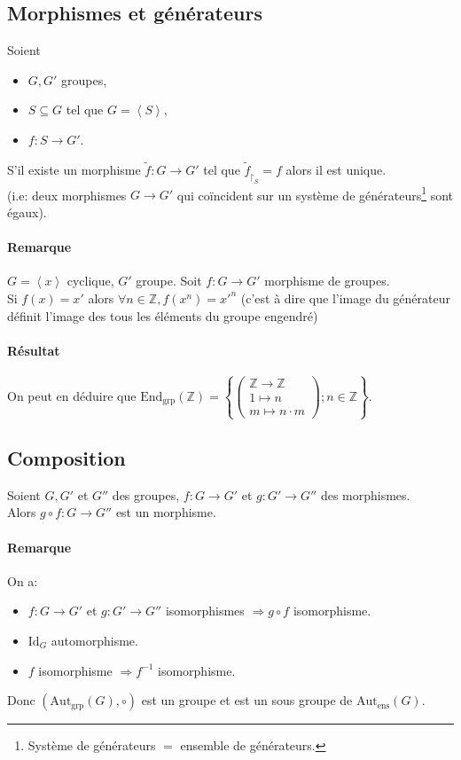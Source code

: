 \documentclass[a4paper,10pt]{report}
\newcommand{\mt}[1]{\widetilde{ #1 }} %
\newcommand{\grp}[1]{\left\langle #1 \right\rangle} %
\newcommand{\set}[1]{\left\lbrace #1 \right\rbrace } %
\newcommand{\IZ}{\mathbb{Z}} %
\newcommand{\so}{\Rightarrow}
\newcommand{\id}{\mathrm{Id}} %
\newcommand{\rstrct}[2]{{ #1 }_{\upharpoonright_{ #2 }}} %
\newcommand{\mfootnote}[1]{\up{(}\footnote{#1}\up{)}}
\newcommand{\Autgrp}[1]{\text{Aut}_{\text{grp}}\left(#1\right)}
\newcommand{\Autens}[1]{\text{Aut}_{\text{ens}}\left(#1\right)}
\begin{document}
   \subsection{Morphismes et générateurs}
    Soient
    \begin{itemize}
      \item $G, G'$ groupes,
      \item $S \subseteq G$ tel que $G=\grp{S}$,
      \item $f: S \to G'$.
    \end{itemize}
    S'il existe un morphisme $\mt{f}:G \to G'$ tel que
    $\rstrct{\mt{f}}{S}=f$ alors il est unique.\\
    (i.e: deux morphismes $G \to G'$ qui coïncident sur un système de
    générateurs\mfootnote{Système de générateurs $=$ ensemble de
    générateurs.} sont égaux).
    \begin{comment}
      \mfootnote{Preuve : 22/10/08 p1}
    \end{comment}

    \paragraph{Remarque}
     $G=\grp{x}$ cyclique, $G'$ groupe. Soit $f:G \to G'$ morphisme de
     groupes.\\
     Si $f(x)=x'$ alors $\forall n \in \IZ, f(x^n)=x'^n$ (c'est à dire que
     l'image du générateur définit l'image des tous les éléments du groupe
     engendré)

    \paragraph{Résultat}
     On peut en déduire que $\text{End}_{\text{grp}}(\IZ) = \set{\left(
     \begin{matrix}
       \IZ \to \IZ\\
       1 \mapsto n\\
       m \mapsto n\cdot m
     \end{matrix} \right); n \in \IZ}$.

   \subsection{Composition}
    Soient $G,G'$ et $G''$ des groupes, $f:G \to G'$ et $g:G' \to G''$ des
    morphismes.\\
    Alors $g\circ f: G \to G''$ est un morphisme.

    \paragraph{Remarque}
     On a: 
     \begin{itemize}
       \item $f:G\to G'$ et $g:G'\to G''$ isomorphismes $\so g\circ f$
         isomorphisme.
       \item $\id_G$ automorphisme.
       \item $f$ isomorphisme $\so f^{-1}$ isomorphisme.  
     \end{itemize}
     Donc $(\Autgrp{G},\circ)$ est un groupe et est un sous groupe
     de $\Autens{G}$.
\end{document}

